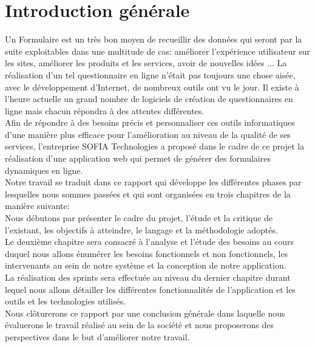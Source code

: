 \section*{Introduction générale}
Un Formulaire est un très bon moyen de recueillir des données qui seront par la suite exploitables dans une multitude de cas: améliorer l’expérience utilisateur sur les sites, améliorer les produits et les services, avoir de nouvelles idées ...
La réalisation d'un tel questionnaire en ligne n'était pas toujours une chose aisée, avec le développement d’Internet, de nombreux outils ont vu le jour. Il existe à l’heure actuelle un grand nombre de logiciels de création de questionnaires en ligne mais chacun répondra à des attentes différentes.\\

Afin de répondre à des besoins précis et personnaliser ces outils informatiques d'une manière plus efficace pour l’amélioration au niveau de la qualité de ses services, l'entreprise SOFIA Technologies a proposé dans le cadre de ce projet la réalisation d'une application web qui permet de générer des formulaires dynamiques en ligne.\\    

Notre travail se traduit dans ce rapport qui développe les différentes phases par lesquelles nous sommes passées et qui sont organisées en trois chapitres de la manière suivante: \\
Nous débutons par présenter le cadre du projet, l’étude et la critique de l’existant, les objectifs
à atteindre, le langage et la méthodologie adoptés.\\
Le deuxième chapitre sera consacré à l’analyse et l’étude des besoins au cours duquel nous
allons énumérer les besoins fonctionnels et non fonctionnels, les intervenants au sein de notre
système et la conception de notre application.\\
La réalisation des sprints sera effectuée au niveau du dernier chapitre durant lequel nous allons détailler les différentes
fonctionnalités de l'application et les outils et les technologies utilisés.\\

Nous clôturerons ce rapport par une conclusion générale dans laquelle nous évaluerons le
travail réalisé au sein de la société et nous proposerons des perspectives dans le but d’améliorer
notre travail.
